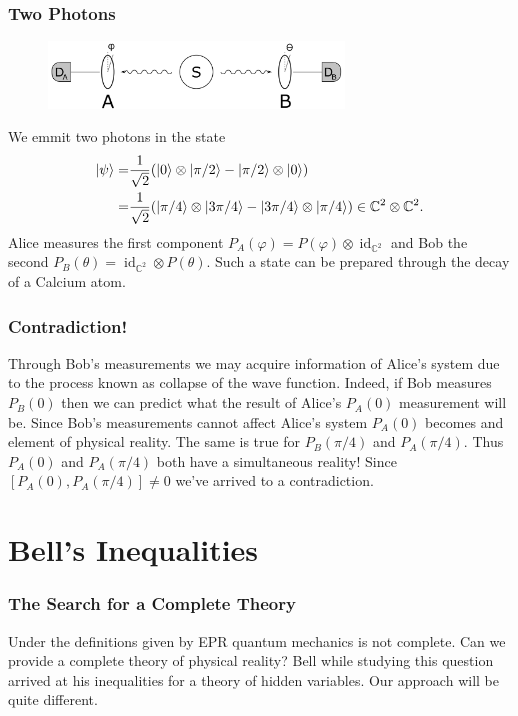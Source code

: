 \documentclass{beamer}
\DeclareMathOperator{\id}{id}
\begin{document}
\begin{frame}

	\frametitle{Two Photons}
	
	\begin{figure}
		\includegraphics[width=0.7\textwidth]{bell_experiment.png}
	\end{figure}		
	
	We emmit two photons in the state
	\begin{align}
	\begin{split}
		\ket{\psi}=&\frac{1}{\sqrt{2}}(\ket{0}\otimes\ket{\pi/2}-\ket{\pi/2}\otimes\ket{0})\\
		=&\frac{1}{\sqrt{2}}(\ket{\pi/4}\otimes\ket{3\pi/4}-\ket{3\pi/4}\otimes\ket{\pi/4})\in\mathbb{C}^2\otimes\mathbb{C}^2.
	\end{split}
	\end{align}
	Alice measures the first component $P_A(\varphi)=P(\varphi)\otimes\id_{\mathbb{C}^2}$ and Bob the second $P_B(\theta)=\id_{\mathbb{C}^2}\otimes P(\theta)$. Such a state can be prepared through the decay of a Calcium atom\cite{Reyes2013}.

\end{frame}

\begin{frame}

	\frametitle{Contradiction!}
	
	Through Bob's measurements we may acquire information of Alice's system due to the process known as collapse of the wave function. Indeed, if Bob measures $P_B(0)$ then we can predict what the result of Alice's $P_A(0)$ measurement will be. Since Bob's measurements cannot affect Alice's system $P_A(0)$ becomes and element of physical reality. The same is true for $P_B(\pi/4)$ and $P_A(\pi/4)$. Thus $P_A(0)$ and $P_A(\pi/4)$ both have a simultaneous reality! Since $[P_A(0),P_A(\pi/4)]\neq 0$ we've arrived to a contradiction. 

\end{frame}

\section{Bell's Inequalities}

\begin{frame}

	\frametitle{The Search for a Complete Theory}
	
	Under the definitions given by EPR quantum mechanics is not complete. Can we provide a complete theory of physical reality? Bell while studying this question arrived at his inequalities for a theory of hidden variables\cite{Bell1964}. Our approach will be quite different.

\end{frame}
	
\end{document}
